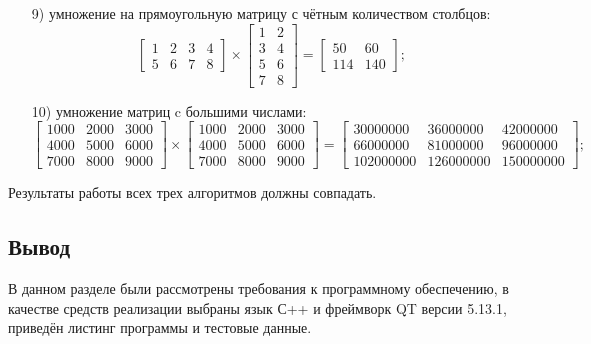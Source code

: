 \documentclass[a4paper,12pt]{article}
\begin{document}
\begin{enumerate}
	\item[9)] умножение на  прямоугольную матрицу с чётным количеством столбцов:
\[ \begin{bmatrix}
1 & 2 & 3 & 4\\
5 & 6 & 7 & 8
\end{bmatrix} \times 
\begin{bmatrix}
1 & 2 \\
3 & 4 \\
5 & 6 \\
7 & 8
\end{bmatrix} =
\begin{bmatrix}
50 & 60 \\
114 & 140
\end{bmatrix}; \]

	\item[10)] умножение матриц c большими числами:	
\[ \begin{bmatrix}
1000 & 2000 & 3000 \\
4000 & 5000 & 6000  \\
7000 & 8000 & 9000
\end{bmatrix} \times 
 \begin{bmatrix}
1000 & 2000 & 3000 \\
4000 & 5000 & 6000  \\
7000 & 8000 & 9000
\end{bmatrix} =
\begin{bmatrix}
30000000 & 36000000 & 42000000 \\
66000000 & 81000000 & 96000000 \\
102000000 & 126000000 & 150000000
\end{bmatrix}; \]

	\end{enumerate}
    
    Результаты работы всех трех алгоритмов должны совпадать.
	

		

		
	 
	
	

	
	
	\subsection*{Вывод}
	
	В данном разделе были рассмотрены требования к программному обеспечению, в качестве средств реализации выбраны язык С++ и фреймворк QT версии 5.13.1, приведён листинг программы и тестовые данные. 
	
\end{document}
